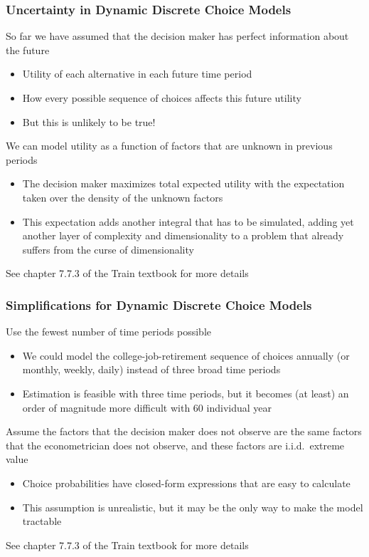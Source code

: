 \documentclass{beamer}
\begin{document}
\begin{frame}\frametitle{Uncertainty in Dynamic Discrete Choice Models}
    So far we have assumed that the decision maker has perfect information about the future
    \begin{itemize}
        \item Utility of each alternative in each future time period
        \item How every possible sequence of choices affects this future utility
        \item But this is unlikely to be true!
    \end{itemize}
    \vspace{2ex}
    We can model utility as a function of factors that are unknown in previous periods
    \begin{itemize}
        \item The decision maker maximizes total expected utility with the expectation taken over the density of the unknown factors
        \item This expectation adds another integral that has to be simulated, adding yet another layer of complexity and dimensionality to a problem that already suffers from the curse of dimensionality
    \end{itemize}
    \vspace{2ex}
    See chapter 7.7.3 of the Train textbook for more details
\end{frame}

\begin{frame}\frametitle{Simplifications for Dynamic Discrete Choice Models}
    Use the fewest number of time periods possible
    \begin{itemize}
        \item We could model the college-job-retirement sequence of choices annually (or monthly, weekly, daily) instead of three broad time periods
        \item Estimation is feasible with three time periods, but it becomes (at least) an order of magnitude more difficult with 60 individual year
    \end{itemize}
    \vspace{2ex}
    Assume the factors that the decision maker does not observe are the same factors that the econometrician does not observe, and these factors are i.i.d.\ extreme value
    \begin{itemize}
        \item Choice probabilities have closed-form expressions that are easy to calculate
        \item This assumption is unrealistic, but it may be the only way to make the model tractable
    \end{itemize}
    \vspace{2ex}
    See chapter 7.7.3 of the Train textbook for more details
\end{frame}
\end{document}
